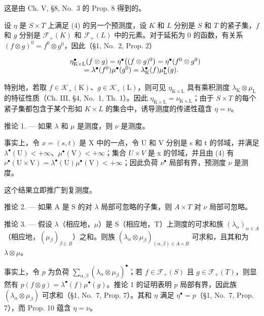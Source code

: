 这是由 Ch. V, §8, No.~3 的 Prop. 8 得到的。

设 \(\eta\) 是 \(S \times T\) 上满足 (4) 的另一个预测度，设 \(K\) 和 \(L\) 分别是 \(S\) 和 \(T\) 的紧子集，\(f\) 和 \(g\) 分别是 \(\mathcal{F}_{+}(K)\) 和 \(\mathcal{F}_{+}(L)\) 中的元素。对于延拓为 0 的函数，有关系 \((f \otimes g)^{0} = f^{0} \otimes g^{0}\)，因此（§1, No.~2, Prop. 2）

\[
\begin{array}{r l} & {\eta_ {\mathrm{K} \times \mathrm{L}} ^ {\bullet} (f \otimes g) = \eta^ {\bullet} \big ((f \otimes g) ^ {0} \big) = \eta^ {\bullet} (f ^ {0} \otimes g ^ {0})} \\ & {\qquad = \lambda^ {\bullet} (f ^ {0}) \mu^ {\bullet} (g ^ {0}) = \lambda_ {\mathrm{K}} ^ {\bullet} (f) \mu_ {\mathrm{L}} ^ {\bullet} (g).} \end{array}
\]

特别地，若取 \(f \in \mathcal{K}_{+}(\mathrm{K})\)、\(g \in \mathcal{K}_{+}(\mathrm{L})\)，则可见 \(\eta_{\mathrm{K} \times \mathrm{L}}\) 具有乘积测度 \(\lambda_{\mathrm{K}} \otimes \mu_{\mathrm{L}}\) 的特征性质（Ch. III, §4, No.~1, Th. 1）。因此 \(\eta_{\mathrm{K} \times \mathrm{L}} = \nu_{\mathrm{K} \times \mathrm{L}}\)；由于 \(S \times T\) 的每个紧子集都包含于某个形如 \(K \times L\) 的集合中，诱导测度的传递性蕴含 \(\eta = \nu\)。

推论 1. --- 如果 \(\lambda\) 和 \(\mu\) 是测度，则 \(\nu\) 是测度。

事实上，令 \(x = (s, t)\) 是 X 中的一点，令 U 和 V 分别是 s 和 t 的邻域，并满足 \(\lambda^{\bullet}(\mathrm{U}) < +\infty\)、\(\mu^{\bullet}(\mathrm{V}) < +\infty\)；集合 \(U \times V\) 是 x 的邻域，并且由 (4) 有 \(\nu^{\bullet}(\mathrm{U} \times \mathrm{V}) = \lambda^{\bullet}(\mathrm{U}) \mu^{\bullet}(\mathrm{V}) < +\infty\)；因此负荷 \(\nu^{\bullet}\) 局部有界，预测度 \(\nu\) 是测度。

这个结果立即推广到复测度。

推论 2. --- 如果 A 是 S 的对 \(\lambda\) 局部可忽略的子集，则 \(A \times T\) 对 \(\nu\) 局部可忽略。

推论 3. --- 假设 \(\lambda\)（相应地，\(\mu\)）是 S（相应地，T）上测度的可求和族 \((\lambda_{\alpha})_{\alpha \in A}\)（相应地，\((\mu_{\beta})_{\beta \in B}\)）之和。则族 \((\lambda_{\alpha} \otimes \mu_{\beta})_{(\alpha, \beta) \in A \times B}\) 可求和，且其和为 \(\lambda \otimes \mu\)。

事实上，令 \(p\) 为负荷 \(\sum_{\alpha, \beta} (\lambda_{\alpha} \otimes \mu_{\beta})^{\bullet}\)；若 \(f \in \mathcal{F}_{+}(S)\) 且 \(g \in \mathcal{F}_{+}(T)\)，则显然有 \(p(f \otimes g) = \lambda^{\bullet}(f)\mu^{\bullet}(g)\)。推论 1 的证明表明 \(p\) 局部有界，因此族 \((\lambda_{\alpha} \otimes \mu_{\beta})\) 可求和（§1, No.~7, Prop. 7）。其和 \(\eta\) 满足 \(\eta^{\bullet} = p\)（§1, No.~7, Prop. 7），而 Prop. 10 蕴含 \(\eta = \nu\)。

